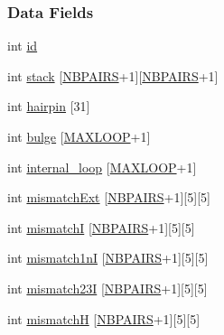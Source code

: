 \subsubsection*{Data Fields}
\begin{DoxyCompactItemize}
\item 
int \mbox{\hyperlink{group__energy__parameters_ab2e674fea69570fb83bcf63f19e433ee}{id}}
\item 
int \mbox{\hyperlink{group__energy__parameters_af7cdedcea1bb1c171856ab06dc9f6ed2}{stack}} \mbox{[}\mbox{\hyperlink{energy__const_8h_a5e75221c779d618eab81e096f37e32ce}{N\+B\+P\+A\+I\+RS}}+1\mbox{]}\mbox{[}\mbox{\hyperlink{energy__const_8h_a5e75221c779d618eab81e096f37e32ce}{N\+B\+P\+A\+I\+RS}}+1\mbox{]}
\item 
int \mbox{\hyperlink{group__energy__parameters_ac3160bdbb97b2ef9e949c9ba66bf057c}{hairpin}} \mbox{[}31\mbox{]}
\item 
int \mbox{\hyperlink{group__energy__parameters_aa7121473b8a705f84048c09b12c1d1c2}{bulge}} \mbox{[}\mbox{\hyperlink{energy__const_8h_ad1bd6eabac419670ddd3c9ed82145988}{M\+A\+X\+L\+O\+OP}}+1\mbox{]}
\item 
int \mbox{\hyperlink{group__energy__parameters_a2a4fb2c65023ec371c9b96573da6d2fc}{internal\+\_\+loop}} \mbox{[}\mbox{\hyperlink{energy__const_8h_ad1bd6eabac419670ddd3c9ed82145988}{M\+A\+X\+L\+O\+OP}}+1\mbox{]}
\item 
int \mbox{\hyperlink{group__energy__parameters_a6122f31447a8cccdd1203c9695ba1e3b}{mismatch\+Ext}} \mbox{[}\mbox{\hyperlink{energy__const_8h_a5e75221c779d618eab81e096f37e32ce}{N\+B\+P\+A\+I\+RS}}+1\mbox{]}\mbox{[}5\mbox{]}\mbox{[}5\mbox{]}
\item 
int \mbox{\hyperlink{group__energy__parameters_af1a456ce5983b107c47e5dd25727205e}{mismatchI}} \mbox{[}\mbox{\hyperlink{energy__const_8h_a5e75221c779d618eab81e096f37e32ce}{N\+B\+P\+A\+I\+RS}}+1\mbox{]}\mbox{[}5\mbox{]}\mbox{[}5\mbox{]}
\item 
int \mbox{\hyperlink{group__energy__parameters_a6058cd6334a2e5929bd36315e9d0fe3a}{mismatch1nI}} \mbox{[}\mbox{\hyperlink{energy__const_8h_a5e75221c779d618eab81e096f37e32ce}{N\+B\+P\+A\+I\+RS}}+1\mbox{]}\mbox{[}5\mbox{]}\mbox{[}5\mbox{]}
\item 
int \mbox{\hyperlink{group__energy__parameters_a2d8a2ed8936cd60fbed953a2bc64f9b3}{mismatch23I}} \mbox{[}\mbox{\hyperlink{energy__const_8h_a5e75221c779d618eab81e096f37e32ce}{N\+B\+P\+A\+I\+RS}}+1\mbox{]}\mbox{[}5\mbox{]}\mbox{[}5\mbox{]}
\item 
int \mbox{\hyperlink{group__energy__parameters_ad07794648fa1cac6f02c57c095fb53e6}{mismatchH}} \mbox{[}\mbox{\hyperlink{energy__const_8h_a5e75221c779d618eab81e096f37e32ce}{N\+B\+P\+A\+I\+RS}}+1\mbox{]}\mbox{[}5\mbox{]}\mbox{[}5\mbox{]}

\end{DoxyCompactItemize}
